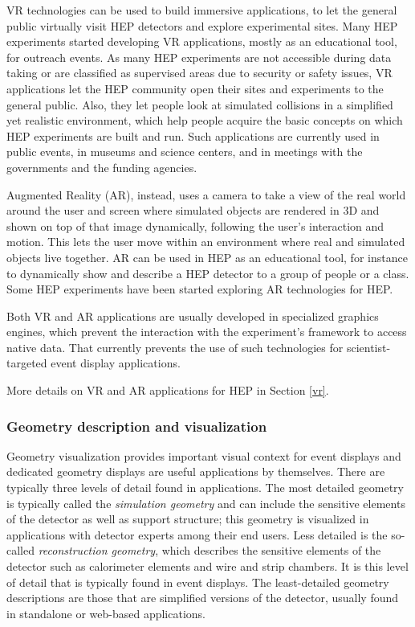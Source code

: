 \documentclass[12pt,a4paper]{article}
\begin{document}
VR technologies can be used to build immersive applications, to let the general public virtually visit HEP detectors and explore experimental sites. Many HEP experiments started developing VR applications, mostly as an educational tool, for outreach events. As many HEP experiments are not accessible during data taking or are classified as supervised areas due to security or safety issues, VR applications let the HEP community open their sites and experiments to the general public. Also, they let people look at simulated  collisions in a simplified yet realistic environment, which help people acquire the basic concepts on which HEP experiments are built and run. Such applications are currently used in public events, in museums and science centers, and in meetings with the governments and the funding agencies.

Augmented Reality (AR), instead, uses a camera to take a view of the real world around the user and screen where simulated objects are rendered in 3D and shown on top of that image dynamically, following the user's interaction and motion. This lets the user move within an environment where real and simulated objects live together. AR can be used in HEP as an educational tool, for instance to dynamically show and describe a HEP detector to a group of people or a class. Some HEP experiments have been started exploring AR  technologies for HEP.

Both VR and AR applications are usually developed in specialized graphics engines, which prevent the interaction with the experiment's framework to access native data. That currently prevents the use of such technologies for scientist-targeted event display applications.

More details on VR and AR applications for HEP in Section \ref{vr}.




\hypertarget{geometry-description}{%
\subsubsection{Geometry description and visualization}\label{geometry-description}}

Geometry visualization provides important visual context for event displays and dedicated geometry displays are useful applications by themselves.
There are typically three levels of detail found in applications. The most detailed geometry is typically called the \textit{simulation geometry}
and can include the sensitive elements of the detector as well as support structure; this geometry is visualized in applications with detector experts among their end users. Less detailed is the so-called \textit{reconstruction geometry}, which describes the sensitive elements of the detector such as calorimeter elements and wire and strip chambers. It is this level of
detail that is typically found in event displays. The least-detailed geometry descriptions are those that are simplified versions of the
detector, usually found in standalone or web-based applications.
\end{document}
